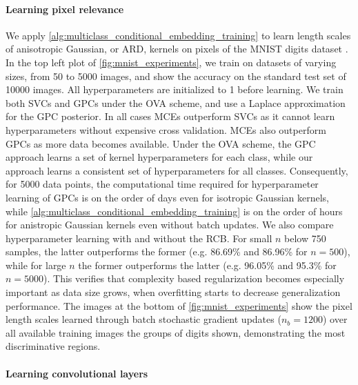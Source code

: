 \documentclass[runningheads, envcountsame, a4paper]{llncs}
\begin{document}
		\paragraph{Learning pixel relevance}
	
			We apply \cref{alg:multiclass_conditional_embedding_training} to learn length scales of anisotropic Gaussian, or \gls{ARD}, kernels on pixels of the MNIST digits dataset \citep{lecun1998gradient}. In the top left plot of \cref{fig:mnist_experiments}, we train on datasets of varying sizes, from 50 to 5000 images, and show the accuracy on the standard test set of 10000 images. All hyperparameters are initialized to 1 before learning. We train both \glspl{SVC} and \glspl{GPC} under the \gls{OVA} scheme, and use a Laplace approximation for the \gls{GPC} posterior. In all cases \glspl{MCE} outperform \glspl{SVC} as it cannot learn hyperparameters without expensive cross validation. \glspl{MCE} also outperform \glspl{GPC} as more data becomes available. Under the \gls{OVA} scheme, the \gls{GPC} approach learns a set of kernel hyperparameters for each class, while our approach learns a consistent set of hyperparameters for all classes. Consequently, for 5000 data points, the computational time required for hyperparameter learning of \glspl{GPC} is on the order of days even for isotropic Gaussian kernels, while \cref{alg:multiclass_conditional_embedding_training} is on the order of hours for anistropic Gaussian kernels even without batch updates. We also compare hyperparameter learning with and without the \gls{RCB}. For small $n$ below 750 samples, the latter outperforms the former (e.g. 86.69\% and 86.96\% for $n = 500$), while for large $n$ the former outperforms the latter (e.g. 96.05\% and 95.3\% for $n= 5000$). This verifies that complexity based regularization becomes especially important as data size grows, when overfitting starts to decrease generalization performance. The images at the bottom of \cref{fig:mnist_experiments} show the pixel length scales learned through batch stochastic gradient updates ($n_{b} = 1200$) over all available training images the groups of digits shown, demonstrating the most discriminative regions.
	
		\paragraph{Learning convolutional layers}
	
\end{document}
